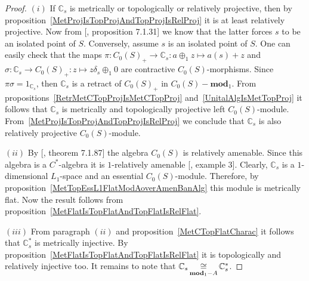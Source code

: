 \begin{proof} $(i)$ If $\mathbb{C}_s$ is metrically or topologically or
relatively projective, then by
proposition~\ref{MetProjIsTopProjAndTopProjIsRelProj} it is at least relatively
projective. Now from [\cite{HelBanLocConvAlg}, proposition 7.1.31] we know that
the latter forces $s$ to be an isolated point of $S$. Conversely, assume $s$ is
an isolated point of $S$. One can easily check that the maps
$\pi:{C_0(S)}_+\to\mathbb{C}_s:a\oplus_1 z\mapsto a(s)+z$ and
$\sigma:\mathbb{C}_s\to {C_0(S)}_+:z\mapsto z\delta_s\oplus_1 0$ are contractive
$C_0(S)$-morphisms. Since $\pi\sigma=1_{\mathbb{C}_s}$, then $\mathbb{C}_s$ is a
retract of ${C_0(S)}_+$ in $C_0(S)-\mathbf{mod}_1$. From
propositions~\ref{RetrMetCTopProjIsMetCTopProj} and~\ref{UnitalAlgIsMetTopProj} 
it follows that $\mathbb{C}_s$ is metrically and topologically projective left
$C_0(S)$-module. From~\ref{MetProjIsTopProjAndTopProjIsRelProj} we conclude that
$\mathbb{C}_s$ is also relatively projective $C_0(S)$-module.

$(ii)$ By [\cite{HelBanLocConvAlg}, theorem 7.1.87] the algebra $C_0(S)$ is
relatively amenable. Since this algebra is a $C^*$-algebra it is $1$-relatively 
amenable [\cite{RundeAmenConstFour}, example 3]. Clearly, $\mathbb{C}_s$ is a
$1$-dimensional $L_1$-space and an essential $C_0(S)$-module. Therefore, by
proposition~\ref{MetTopEssL1FlatModAoverAmenBanAlg} this module is metrically
flat. Now the result follows from
proposition~\ref{MetFlatIsTopFlatAndTopFlatIsRelFlat}.

$(iii)$ From paragraph $(ii)$ and proposition~\ref{MetCTopFlatCharac} it follows
that $\mathbb{C}_s^*$ is metrically injective. By
proposition~\ref{MetFlatIsTopFlatAndTopFlatIsRelFlat} it is topologically and
relatively injective too. It remains to note that
$\mathbb{C}_s\mathop{\mathbin{\cong}}\limits_{\mathbf{mod}_1-A}\mathbb{C}_s^*$. 
\end{proof}

